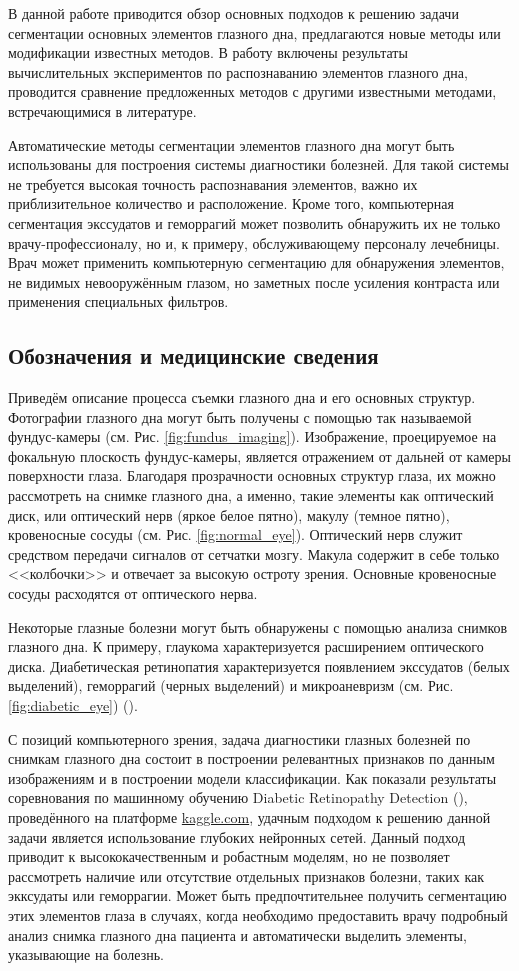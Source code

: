 \documentclass[12pt,fleqn]{article}
\begin{document}
В данной работе приводится обзор основных подходов к решению задачи сегментации основных элементов глазного дна, предлагаются новые методы или модификации известных методов. В работу включены результаты вычислительных экспериментов по распознаванию элементов глазного дна, проводится сравнение предложенных методов с другими известными методами, встречающимися в литературе.

Автоматические методы сегментации элементов глазного дна могут быть использованы для построения системы диагностики болезней. Для такой системы не требуется высокая точность распознавания элементов, важно их приблизительное количество и расположение. Кроме того, компьютерная сегментация экссудатов и геморрагий может позволить обнаружить их не только врачу-профессионалу, но и, к примеру, обслуживающему персоналу лечебницы. Врач может применить компьютерную сегментацию для обнаружения элементов, не видимых невооружённым глазом, но заметных после усиления контраста или применения специальных фильтров.

\subsection{Обозначения и медицинские сведения}

Приведём описание процесса съемки глазного дна и его основных структур. Фотографии глазного дна могут быть получены с помощью так называемой фундус-камеры (см. Рис. \ref{fig:fundus_imaging}). Изображение, проецируемое на фокальную плоскость фундус-камеры, является отражением от дальней от камеры поверхности глаза. Благодаря прозрачности основных структур глаза, их можно рассмотреть на снимке глазного дна, а именно, такие элементы как оптический диск, или оптический нерв (яркое белое пятно), макулу (темное пятно), кровеносные сосуды (см. Рис. \ref{fig:normal_eye}). Оптический нерв служит средством передачи сигналов от сетчатки мозгу. Макула содержит в себе только <<колбочки>> и отвечает за высокую остроту зрения. Основные кровеносные сосуды расходятся от оптического нерва.

Некоторые глазные болезни могут быть обнаружены с помощью анализа снимков глазного дна. К примеру, глаукома характеризуется расширением оптического диска. Диабетическая ретинопатия характеризуется появлением экссудатов (белых выделений), геморрагий (черных выделений) и микроаневризм (см. Рис. \ref{fig:diabetic_eye}) (\cite{medical_dr}).

С позиций компьютерного зрения, задача диагностики глазных болезней по снимкам глазного дна состоит в построении релевантных признаков по данным изображениям и в построении модели классификации. Как показали результаты соревнования по машинному обучению Diabetic Retinopathy Detection (\cite{kaggle}), проведённого на платформе \url{kaggle.com}, удачным подходом к решению данной задачи является использование глубоких нейронных сетей. Данный подход приводит к высококачественным и робастным моделям, но не позволяет рассмотреть наличие или отсутствие отдельных признаков болезни, таких как экксудаты или геморрагии. Может быть предпочтительнее получить сегментацию этих элементов глаза в случаях, когда необходимо предоставить врачу подробный анализ снимка глазного дна пациента и автоматически выделить элементы, указывающие на болезнь.
\end{document}

